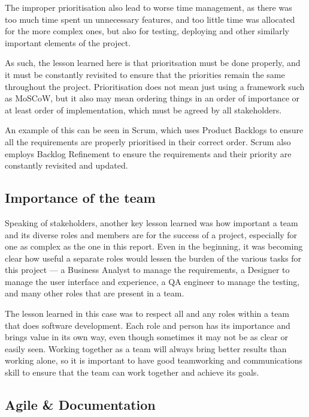 The improper prioritisation also lead to worse time management, as there was too much time spent un unnecessary features, and too little time was allocated for the more complex ones, but also for testing, deploying and other similarly important elements of the project. 

As such, the lesson learned here is that prioritsation must be done properly, and it must be constantly revisited to ensure that the priorities remain the same throughout the project. Prioritisation does not mean just using a framework such as MoSCoW, but it also may mean ordering things in an order of importance or at least order of implementation, which must be agreed by all stakeholders. 

An example of this can be seen in Scrum, which uses Product Backlogs to ensure all the requirements are properly prioritised in their correct order. Scrum also employs Backlog Refinement to ensure the requirements and their priority are constantly revisited and updated. 

\subsection{Importance of the team}

Speaking of stakeholders, another key lesson learned was how important a team and its diverse roles and members are for the success of a project, especially for one as complex as the one in this report. Even in the beginning, it was becoming clear how useful a separate roles would lessen the burden of the various tasks for this project --- a Business Analyst to manage the requirements, a Designer to manage the user interface and experience, a QA engineer to manage the testing, and many other roles that are present in a team.

The lesson learned in this case was to respect all and any roles within a team that does software development. Each role and person has its importance and brings value in its own way, even though sometimes it may not be as clear or easily seen. Working together as a team will always bring better results than working alone, so it is important to have good teamworking and communications skill to ensure that the team can work together and achieve its goals.

\subsection{Agile \& Documentation}


